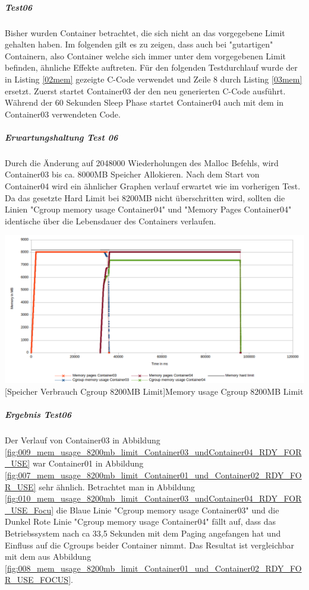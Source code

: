 \subparagraph{Test06}
Bisher wurden Container betrachtet, die sich nicht an das vorgegebene Limit gehalten haben. Im folgenden gilt es zu zeigen, dass auch bei "gutartigen" Containern, also Container welche sich immer unter dem vorgegebenen Limit befinden, ähnliche Effekte auftreten. Für den folgenden Testdurchlauf wurde der in Listing \ref{02mem} gezeigte C-Code verwendet und Zeile 8 durch Listing \ref{03mem} ersetzt. Zuerst startet Container03 der den neu generierten C-Code ausführt. Während der 60 Sekunden Sleep Phase startet Container04 auch mit dem in Container03 verwendeten Code.

\vspace{1em}


\subparagraph{Erwartungshaltung Test 06}
Durch die Änderung auf 2048000 Wiederholungen des Malloc Befehls, wird Container03 bis ca. 8000MB Speicher Allokieren. Nach dem Start von Container04 wird ein ähnlicher Graphen verlauf erwartet wie im vorherigen Test. Da das gesetzte Hard Limit bei 8200MB nicht überschritten wird, sollten die Linien "Cgroup memory usage Container04" und "Memory Pages Container04" identische über die Lebensdauer des Containers verlaufen.

\vspace{1em}
\begin{minipage}{\linewidth}
	\centering
	\includegraphics[width=1\linewidth]{pics/009_mem_usage_8200mb_limit_Container03_undContainer04_RDY_FOR_USE.png}
	[Speicher Verbrauch Cgroup 8200MB Limit]{Memory usage Cgroup 8200MB Limit}
	\label{fig:009_mem_usage_8200mb_limit_Container03_undContainer04_RDY_FOR_USE}
\end{minipage}

\subparagraph{Ergebnis Test06}
Der Verlauf von Container03 in Abbildung \ref{fig:009_mem_usage_8200mb_limit_Container03_undContainer04_RDY_FOR_USE} war Container01 in Abbildung \ref{fig:007_mem_usage_8200mb_limit_Container01_und_Container02_RDY_FOR_USE} sehr ähnlich. Betrachtet man in Abbildung \ref{fig:010_mem_usage_8200mb_limit_Container03_undContainer04_RDY_FOR_USE_Focu} die Blaue Linie "Cgroup memory usage Container03" und die Dunkel Rote Linie "Cgroup memory usage Container04" fällt auf, dass das Betriebssystem nach ca 33,5 Sekunden mit dem Paging angefangen hat und Einfluss auf die Cgroups beider Container nimmt. Das Resultat ist vergleichbar mit dem aus Abbildung \ref{fig:008_mem_usage_8200mb_limit_Container01_und_Container02_RDY_FOR_USE_FOCUS}.  

